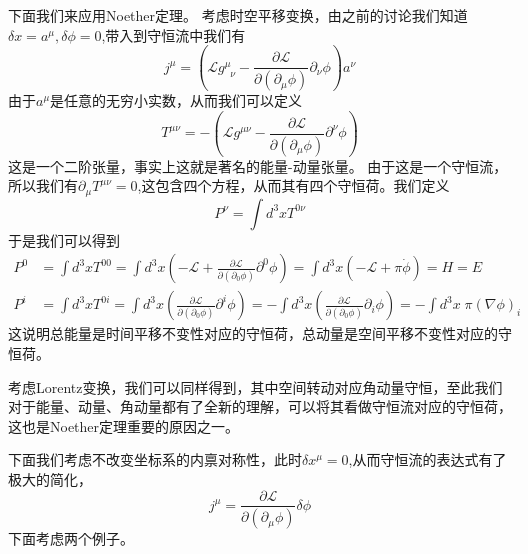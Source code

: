 下面我们来应用Noether定理。
考虑时空平移变换，由之前的讨论我们知道$\delta x=a^{\mu},\delta \phi=0$,带入到守恒流中我们有
\begin{equation}
    j^{\mu}=\left(\mathcal{L}g^{\mu}_{\;\;\nu}- \frac{\partial \mathcal{L}}{\partial (\partial_{\mu}\phi)} \partial_{\nu} \phi\right)a^{\nu}
\end{equation}
由于$a^{\mu}$是任意的无穷小实数，从而我们可以定义
\begin{equation}
    T^{\mu\nu}=-\left(\mathcal{L}g^{\mu\nu}- \frac{\partial \mathcal{L}}{\partial (\partial_{\mu}\phi)} \partial^{\nu} \phi\right)
\end{equation}
这是一个二阶张量，事实上这就是著名的能量-动量张量。
由于这是一个守恒流，所以我们有$\partial_{\mu}T^{\mu\nu}=0$,这包含四个方程，从而其有四个守恒荷。我们定义
\begin{equation}
P^{\nu}=\int d^{3}x T^{0\nu}
\end{equation}
于是我们可以得到
\begin{equation}
\label{noetherEP}
\begin{aligned}
    P^{0}&=\int d^{3}x T^{00}= \int d^{3}x\left(-\mathcal{L}+\frac{\partial \mathcal{L}}{\partial (\partial_{0}\phi)} \partial^{0} \phi\right)=\int d^{3}x\left(-\mathcal{L}+\pi\dot{\phi}\right)=H=E\\
    P^{i}&=\int d^{3}x T^{0i}=\int d^{3}x\left(\frac{\partial \mathcal{L}}{\partial (\partial_{0}\phi)} \partial^{i} \phi\right)=-\int d^{3}x\left(\frac{\partial \mathcal{L}}{\partial (\partial_{0}\phi)} \partial_{i} \phi\right)=-\int d^{3}x\;\pi\left(\nabla \phi\right)_{i}
\end{aligned}
\end{equation}
这说明总能量是时间平移不变性对应的守恒荷，总动量是空间平移不变性对应的守恒荷。

考虑Lorentz变换，我们可以同样得到，其中空间转动对应角动量守恒，至此我们对于能量、动量、角动量都有了全新的理解，可以将其看做守恒流对应的守恒荷，这也是Noether定理重要的原因之一。

下面我们考虑不改变坐标系的内禀对称性，此时$\delta x^{\mu}=0$,从而守恒流的表达式有了极大的简化，
\begin{equation}
    j^{\mu}=\frac{\partial \mathcal{L}}{\partial (\partial_{\mu}\phi)} \delta \phi
\end{equation}
下面考虑两个例子。

